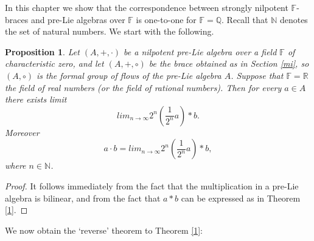 \documentclass[12pt]{article}
\newtheorem{proposition}[theorem]{Proposition}
\begin{document}
$ $

 In this chapter we show that the correspondence between strongly nilpotent $\mathbb F$-braces and pre-Lie algebras over $\mathbb F$ is one-to-one for $\mathbb F=\mathbb Q$.  Recall that $\mathbb N$ denotes the set of natural numbers. We start with the following.

\begin{proposition} \label{lim}
 Let $(A, +, \cdot )$ be a nilpotent  pre-Lie algebra over a field $\mathbb F$ of characteristic zero, and let $(A, +, \circ )$ be the  brace obtained as in Section \ref{mi}, so $(A, \circ )$ is the formal group of flows of the pre-Lie algebra $A$. Suppose that  $\mathbb  F=\mathbb R$ the field of real numbers (or the field of rational numbers).
 Then for every $a\in A$ there exists  limit 
\[ lim_{n\rightarrow \infty}2^{n} ({\frac 1{2^{n}}}a)*b.\]
 Moreover
\[ a\cdot b=lim_{n\rightarrow \infty}2^{n} ({\frac 1{2^{n}}}a)*b,\]
 where $n\in \mathbb N$.
\end{proposition}
\begin{proof}
 It follows immediately from the fact that the multiplication in a pre-Lie algebra is bilinear, and from the fact that $a* b$ can be expressed as in Theorem \ref{1}.
\end{proof}

We now obtain the `reverse' theorem to Theorem \ref{1}:
\end{document}
